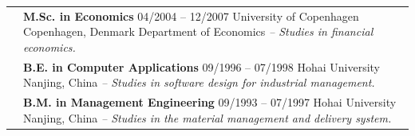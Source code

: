 \documentclass[a4paper,10pt]{article}
\begin{document}
\begin{xtabular}[h]{p{0.15\textwidth}p{0.75\textwidth}}
  & \textbf{M.Sc. in Economics} \hfill 04/2004 -- 12/2007 \newline University of Copenhagen \hfill Copenhagen, Denmark  \newline Department of Economics \newline\emph{-- Studies in financial economics.}\\
  & \textbf{B.E. in Computer Applications} \hfill 09/1996 -- 07/1998 \newline Hohai University \hfill Nanjing, China \newline\emph{-- Studies in software design for industrial management.}\\
  & \textbf{B.M. in Management Engineering} \hfill 09/1993 -- 07/1997 \newline Hohai University \hfill Nanjing, China \newline\emph{-- Studies in the material management and delivery system.}\newline\\
\end{xtabular}\\\newline
\end{document}
